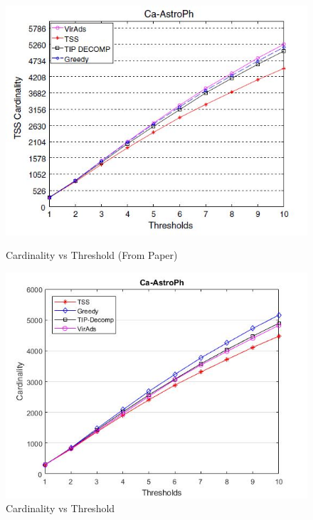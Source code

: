 \begin{figure}[h!]
\begin{minipage}[t]{0.50\textwidth}
\includegraphics[width=\linewidth,keepaspectratio=true]{images/ca-astrophpaper.jpg}
\caption{Cardinality vs Threshold (From Paper)}

\end{minipage}
\begin{minipage}[t]{0.50\textwidth}
\includegraphics[width=\linewidth,keepaspectratio=true]{images/ca-astrophresult.jpg}
\caption{Cardinality vs Threshold}
\end{minipage}
\end{figure}

